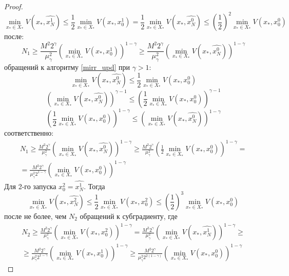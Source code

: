\begin{proof}
       $$
           \min\limits_{x_* \in X_*}{V(x_*, \widehat{x_N^1})} \leq \frac{1}{2} \min\limits_{x_* \in X_*}{V(x_*, x_0^1)} = \frac{1}{2} \min\limits_{x_* \in X_*}{V(x_*, \widehat{x_N^0})} \leq \left(\frac{1}{2}\right)^2 \min\limits_{x_* \in X_*}{V(x_*, x_0^0)}
       $$
       после:
       $$
           N_1 \geq \frac{M^2 2^{\gamma}}{\mu_{\gamma}^2} \left(\min\limits_{x_* \in X_*}{V(x_*, x_0^1)}\right)^{1 - \gamma} \geq \frac{M^2 2^{\gamma}}{\mu_{\gamma}^2} \left(\min\limits_{x_* \in X_*}{V(x_*, \widehat{x_N^0})}\right)^{1 - \gamma} 
       $$
       обращений к алгоритму \eqref{mirr_upd} при $\gamma > 1$:
       $$
           \min\limits_{x_* \in X_*}{V(x_*, \widehat{x_N^0})} \leq \frac{1}{2}\min\limits_{x_* \in X_*}{V(x_*, x_0^0)}  
       $$
       $$
           \left(\min\limits_{x_* \in X_*}{V(x_*, \widehat{x_N^0})}\right)^{\gamma - 1} \leq \left(\frac{1}{2} \min\limits_{x_* \in X_*}{V(x_*, x_0^0)}\right)^{\gamma - 1}
       $$
       $$
            \left(\frac{1}{2} \min\limits_{x_* \in X_*}{V(x_*, x_0^0)}\right)^{1 - \gamma} \leq \left(\min\limits_{x_* \in X_*}{V(x_*, \widehat{x_N^0})}\right)^{1 - \gamma}
       $$
       соответственно:
       $$
       \begin{aligned}
           N_1 \geq \frac{M^2 2^{\gamma}}{\mu_{\gamma}^2} \left(\min\limits_{x_* \in X_*}{V(x_*, \widehat{x_N^0})}\right)^{1 - \gamma} \geq \frac{M^2 2^{\gamma}}{\mu_{\gamma}^2} \left(\frac{1}{2} \min\limits_{x_* \in X_*}{V(x_*, x_0^0)}\right)^{1 - \gamma} =\\
           = \frac{M^2 2^{\gamma}}{\mu_{\gamma}^2 2^{1-\gamma}} \left(\min\limits_{x_* \in X_*}{V(x_*, x_0^0)}\right)^{1 - \gamma}
       \end{aligned}
       $$
       Для 2-го запуска $x_0^2 = \widehat{x_N^1}$. Тогда
       $$
           \min\limits_{x_* \in X_*}{V(x_*, \widehat{x_N^2})} \leq \frac{1}{2} \min\limits_{x_* \in X_*}{V(x_*, x_0^2)} \leq (\frac{1}{2})^3 \min\limits_{x_* \in X_*}{V(x_*, x_0^0)} 
       $$
       после не более, чем $N_2$ обращений к субградиенту, где
       $$
       \begin{aligned}
           N_2 \geq \frac{M^2 2^{\gamma}}{\mu_{\gamma}^2} \left(\min\limits_{x_* \in X_*}{V(x_*, x_0^2)}\right)^{1 - \gamma} = \frac{M^2 2^{\gamma}}{\mu_{\gamma}^2} \left(\min\limits_{x_* \in X_*}{V(x_*, \widehat{x_N^1})}\right)^{1 - \gamma} \geq\\
           \geq \frac{M^2 2^{\gamma}}{\mu_{\gamma}^2 2^{1 - \gamma}} \left(\min\limits_{x_* \in X_*}{V(x_*, x_0^1)}\right)^{1 - \gamma} \geq \frac{M^2 2^{\gamma}}{\mu_{\gamma}^2 2^{2(1 - \gamma)}} \left(\min\limits_{x_* \in X_*}{V(x_*, x_0^0)}\right)^{1 - \gamma}

\end{aligned}$$
\end{proof}
